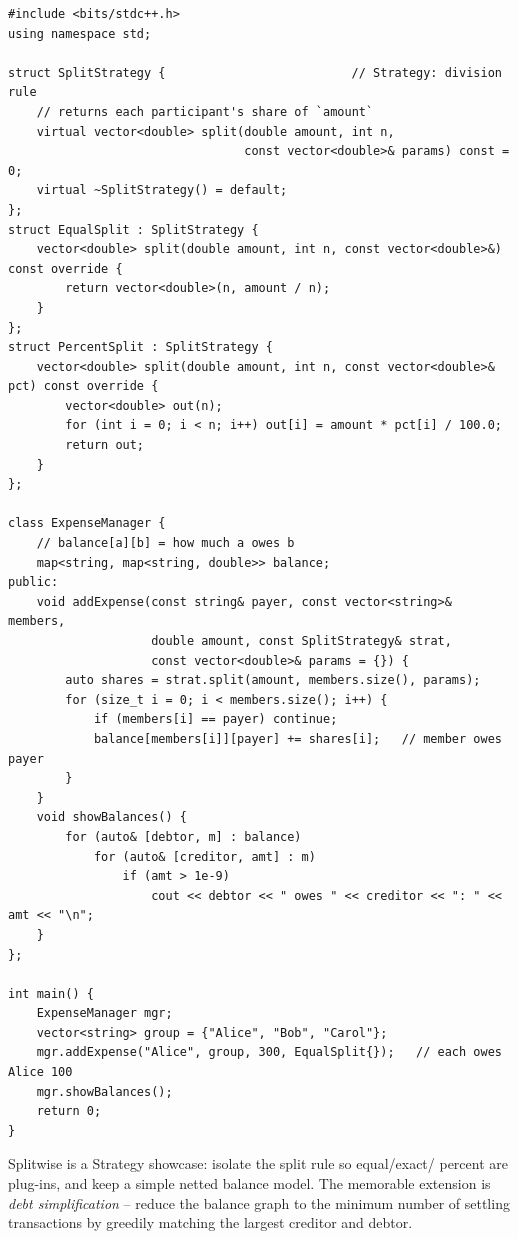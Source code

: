 \begin{lstlisting}
#include <bits/stdc++.h>
using namespace std;

struct SplitStrategy {                          // Strategy: division rule
    // returns each participant's share of `amount`
    virtual vector<double> split(double amount, int n,
                                 const vector<double>& params) const = 0;
    virtual ~SplitStrategy() = default;
};
struct EqualSplit : SplitStrategy {
    vector<double> split(double amount, int n, const vector<double>&) const override {
        return vector<double>(n, amount / n);
    }
};
struct PercentSplit : SplitStrategy {
    vector<double> split(double amount, int n, const vector<double>& pct) const override {
        vector<double> out(n);
        for (int i = 0; i < n; i++) out[i] = amount * pct[i] / 100.0;
        return out;
    }
};

class ExpenseManager {
    // balance[a][b] = how much a owes b
    map<string, map<string, double>> balance;
public:
    void addExpense(const string& payer, const vector<string>& members,
                    double amount, const SplitStrategy& strat,
                    const vector<double>& params = {}) {
        auto shares = strat.split(amount, members.size(), params);
        for (size_t i = 0; i < members.size(); i++) {
            if (members[i] == payer) continue;
            balance[members[i]][payer] += shares[i];   // member owes payer
        }
    }
    void showBalances() {
        for (auto& [debtor, m] : balance)
            for (auto& [creditor, amt] : m)
                if (amt > 1e-9)
                    cout << debtor << " owes " << creditor << ": " << amt << "\n";
    }
};

int main() {
    ExpenseManager mgr;
    vector<string> group = {"Alice", "Bob", "Carol"};
    mgr.addExpense("Alice", group, 300, EqualSplit{});   // each owes Alice 100
    mgr.showBalances();
    return 0;
}
\end{lstlisting}

\begin{takeawaybox}
Splitwise is a Strategy showcase: isolate the split rule so equal/exact/
percent are plug-ins, and keep a simple netted balance model. The
memorable extension is \emph{debt simplification} -- reduce the balance
graph to the minimum number of settling transactions by greedily matching
the largest creditor and debtor.
\end{takeawaybox}
